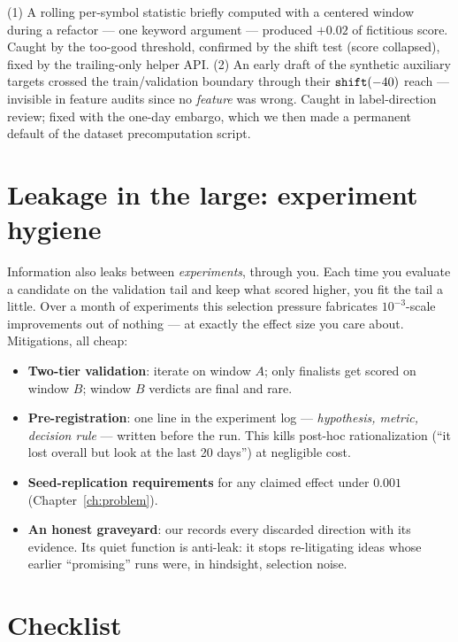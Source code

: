 \begin{jsbox}
(1) A rolling per-symbol statistic briefly computed with a centered window
during a refactor --- one keyword argument --- produced $+0.02$ of
fictitious score. Caught by the too-good threshold, confirmed by the shift
test (score collapsed), fixed by the trailing-only helper API.
(2) An early draft of the synthetic auxiliary targets crossed the
train/validation boundary through their $\texttt{shift}(-40)$ reach ---
invisible in feature audits since no \emph{feature} was wrong. Caught in
label-direction review; fixed with the one-day embargo, which we then made
a permanent default of the dataset precomputation script.
\end{jsbox}

\section{Leakage in the large: experiment hygiene}

Information also leaks between \emph{experiments}, through you. Each time
you evaluate a candidate on the validation tail and keep what scored
higher, you fit the tail a little. Over a month of experiments this
selection pressure fabricates $10^{-3}$-scale improvements out of nothing
--- at exactly the effect size you care about. Mitigations, all cheap:

\begin{itemize}
\item \textbf{Two-tier validation}: iterate on window $A$; only finalists
  get scored on window $B$; window $B$ verdicts are final and rare.
\item \textbf{Pre-registration}: one line in the experiment log ---
  \emph{hypothesis, metric, decision rule} --- written before the run.
  This kills post-hoc rationalization (``it lost overall but look at the
  last 20 days'') at negligible cost.
\item \textbf{Seed-replication requirements} for any claimed effect under
  $0.001$ (Chapter~\ref{ch:problem}).
\item \textbf{An honest graveyard}: our 
  records every discarded direction with its evidence. Its quiet function
  is anti-leak: it stops re-litigating ideas whose earlier ``promising''
  runs were, in hindsight, selection noise.
\end{itemize}

\section{Checklist}

